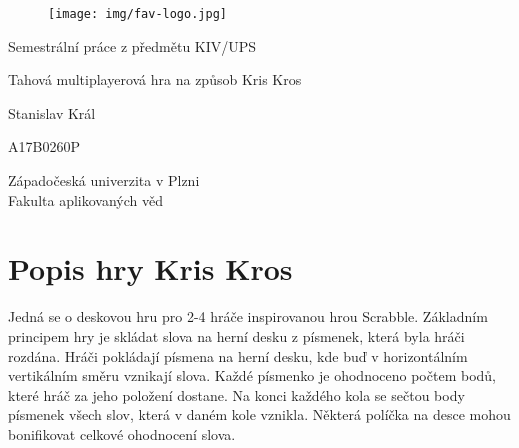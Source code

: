 \documentclass[12pt, a4paper]{article}
\let\oldsection\section
\renewcommand\section{\clearpage\oldsection}
\begin{document}
	\renewcommand{\lstlistingname}{Ukázka zprávy}
	\renewcommand{\lstlistlistingname}{Seznam ukázek}
    \begin{titlepage}

       \centering

       \vspace*{\baselineskip}

       \begin{figure}[H]
          \centering
          \texttt{[image: img/fav-logo.jpg]}
       \end{figure}

       \vspace*{1\baselineskip}
       {\sc Semestrální práce z předmětu KIV/UPS}
       \vspace*{1\baselineskip}

       \vspace{0.75\baselineskip}

       {\LARGE\sc Tahová multiplayerová hra na způsob Kris Kros\\}

       \vspace{4\baselineskip}
       
		\vspace{0.5\baselineskip}

       
       {\sc\Large Stanislav Král \\}

       \vspace{0.5\baselineskip}

       {A17B0260P}

       \vfill

       {\sc Západočeská univerzita v Plzni\\
       Fakulta aplikovaných věd}


    \end{titlepage}


    \tableofcontents
    \pagebreak


    \section{Popis hry Kris Kros}
    Jedná se o deskovou hru pro 2-4 hráče inspirovanou hrou Scrabble. Základním principem hry je skládat slova na herní desku z písmenek, která byla hráči rozdána. Hráči pokládají písmena na herní desku, kde buď v horizontálním vertikálním směru vznikají slova. Každé písmenko je ohodnoceno počtem bodů, které hráč za jeho položení dostane. Na konci každého kola se sečtou body písmenek všech slov, která v daném kole vznikla. Některá políčka na desce mohou bonifikovat celkové ohodnocení slova.
\end{document}
